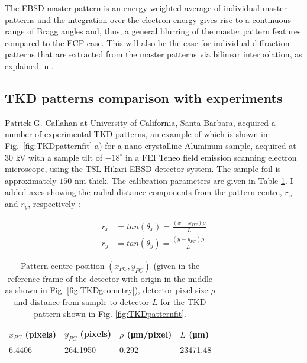 The EBSD master pattern is an energy-weighted average of individual master patterns and the integration over the electron energy gives rise to a continuous range of Bragg angles and, thus, a general blurring of the master pattern features compared to the ECP case. This will also be the case for individual diffraction patterns that are extracted from the master patterns via bilinear interpolation, as explained in \cite{degraef2013e}.


\subsection{TKD patterns comparison with experiments}

Patrick G. Callahan at University of California, Santa Barbara, acquired a number of experimental TKD patterns, an example of which is shown in Fig.~\ref{fig:TKDpatternfit} a) for a nano-crystalline Aluminum sample, acquired at $30$ kV with a sample tilt of $-18^{\circ}$ in a FEI Teneo field emission scanning electron microscope, using the TSL Hikari EBSD detector system.  The sample foil is approximately $150$ nm thick.  The calibration parameters are given in Table \ref{Table:calParams}. I added axes showing the radial distance components from the pattern centre, $r_x$ and $r_y$, respectively :

\begin{align*}
    r_x &= tan(\theta_x) = \frac{(x - x_{PC}) \rho}{L} \\ 
    r_y &= tan(\theta_y) = \frac{(y - y_{PC}) \rho}{L}
\end{align*}


\begin{table}
    \centering
    \begin{tabular}{l l l l }
    \toprule
    $x_{PC}$ (pixels) & $y_{PC}$ (pixels) & $\rho$ (\si{\micro \meter}/pixel) & $L$ (\si{\micro \meter})\\
    \midrule
     6.4406 & 264.1950 & 0.292 & 23471.48 \\
    \bottomrule     
    \end{tabular}
    \caption[Calibration parameters.]{Pattern centre position $(x_{PC}, y_{PC})$ (given in the reference frame of the detector with origin in the middle as shown in Fig. \ref{fig:TKDgeometry}), detector pixel size $\rho$ and distance from sample to detector $L$  for the TKD pattern shown in Fig. \ref{fig:TKDpatternfit}. }
    \label{Table:calParams}
\end{table}



